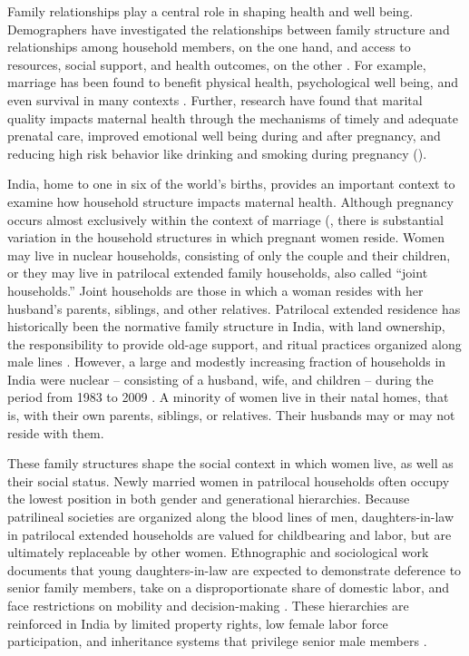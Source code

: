 \documentclass[12pt]{article}
\begin{document}
Family relationships play a central role in shaping health and well being. Demographers have investigated the relationships between family structure and relationships among household members, on the one hand, and access to resources, social support, and health outcomes, on the other \citep{lindemann2019family, waite2000family, umberson2010social}. For example, marriage has been found to benefit physical health, psychological well being, and even survival in many contexts \citep{ross1990impact, begashaw2016health, lewis2004conceptualization, soulsby2015marriage, robles2014marital}. Further, research have found that marital quality impacts maternal health through the mechanisms of timely and adequate prenatal care, improved emotional well being during and after pregnancy, and reducing high risk behavior like drinking and smoking during pregnancy (\cite{alipour2019relationship,rosand2011partner}).

India, home to one in six of the world’s births, provides an important context to examine how household structure impacts maternal health.  Although pregnancy occurs almost exclusively within the context of marriage (\citep{banerji2021does}, there is substantial variation in the household structures in which pregnant women reside. Women may live in nuclear households, consisting of only the couple and their children, or they may live in patrilocal extended family households, also called ``joint households.''  Joint households are those in which a woman resides with her husband’s parents, siblings, and other relatives.  Patrilocal extended residence has historically been the normative family structure in India, with land ownership, the responsibility to provide old-age support, and ritual practices organized along male lines \cite{jayachandran2015roots}.  However, a large and modestly increasing fraction of households in India were nuclear -- consisting of a husband, wife, and children -- during the period from 1983 to 2009 \citep{breton2021modernisation}.  A minority of women live in their natal homes, that is, with their own parents, siblings, or relatives.  Their husbands may or may not reside with them.

These family structures shape the social context in which women live, as well as their social status. Newly married women in patrilocal households often occupy the lowest position in both gender and generational hierarchies. Because patrilineal societies are organized along the blood lines of men, daughters-in-law in patrilocal extended households are valued for childbearing and labor, but are ultimately replaceable by other women. Ethnographic and sociological work documents that young daughters-in-law are expected to demonstrate deference to senior family members, take on a disproportionate share of domestic labor, and face restrictions on mobility and decision-making \citep{mandelbaum1988women, jeffery1989labour}. These hierarchies are reinforced in India by limited property rights, low female labor force participation, and inheritance systems that privilege senior male members \cite{jayachandran2015roots}. 
\end{document}
